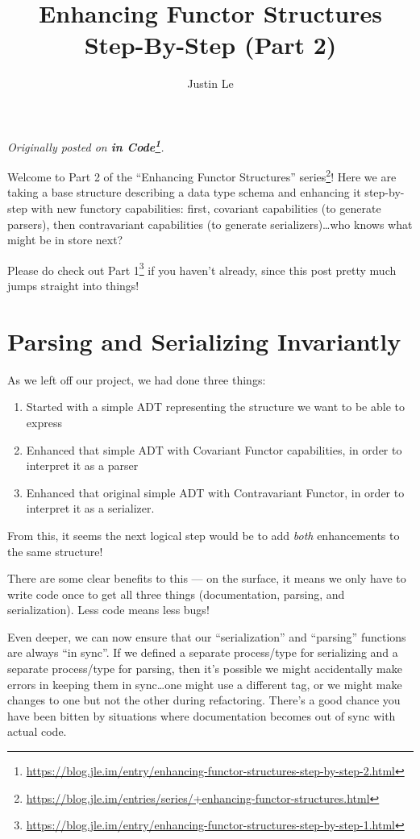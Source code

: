 \documentclass[]{article}
\title{Enhancing Functor Structures Step-By-Step (Part 2)}
\author{Justin Le}
\renewcommand{\href}[2]{#2\footnote{\url{#1}}}
\begin{document}
\maketitle

\emph{Originally posted on
\textbf{\href{https://blog.jle.im/entry/enhancing-functor-structures-step-by-step-2.html}{in
Code}}.}

Welcome to Part 2 of the
\href{https://blog.jle.im/entries/series/+enhancing-functor-structures.html}{``Enhancing
Functor Structures'' series}! Here we are taking a base structure describing a
data type schema and enhancing it step-by-step with new functory capabilities:
first, covariant capabilities (to generate parsers), then contravariant
capabilities (to generate serializers)\ldots who knows what might be in store
next?

Please do check out
\href{https://blog.jle.im/entry/enhancing-functor-structures-step-by-step-1.html}{Part
1} if you haven't already, since this post pretty much jumps straight into
things!

\hypertarget{parsing-and-serializing-invariantly}{%
\section{Parsing and Serializing
Invariantly}\label{parsing-and-serializing-invariantly}}

As we left off our project, we had done three things:

\begin{enumerate}
\def\labelenumi{\arabic{enumi}.}
\tightlist
\item
  Started with a simple ADT representing the structure we want to be able to
  express
\item
  Enhanced that simple ADT with Covariant Functor capabilities, in order to
  interpret it as a parser
\item
  Enhanced that original simple ADT with Contravariant Functor, in order to
  interpret it as a serializer.
\end{enumerate}

From this, it seems the next logical step would be to add \emph{both}
enhancements to the same structure!

There are some clear benefits to this --- on the surface, it means we only have
to write code once to get all three things (documentation, parsing, and
serialization). Less code means less bugs!

Even deeper, we can now ensure that our ``serialization'' and ``parsing''
functions are always ``in sync''. If we defined a separate process/type for
serializing and a separate process/type for parsing, then it's possible we might
accidentally make errors in keeping them in sync\ldots one might use a different
tag, or we might make changes to one but not the other during refactoring.
There's a good chance you have been bitten by situations where documentation
becomes out of sync with actual code.
\end{document}
